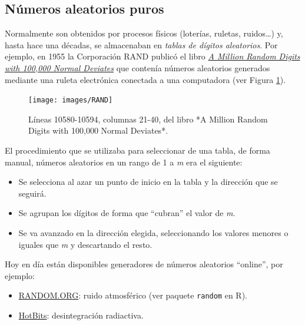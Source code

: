 \documentclass[
]{book}
\theoremstyle{break}
\theoremstyle{nonumberplain}
\begin{document}
\hypertarget{nuxfameros-aleatorios-puros}{%
\subsection{Números aleatorios puros}\label{nuxfameros-aleatorios-puros}}

Normalmente son obtenidos por procesos físicos (loterías, ruletas, ruidos\ldots) y, hasta hace una décadas, se almacenaban en \emph{tablas de dígitos aleatorios}.
Por ejemplo, en 1955 la Corporación RAND publicó el libro \href{https://www.rand.org/pubs/monograph_reports/MR1418.html}{\emph{A Million Random Digits with 100,000 Normal Deviates}} que contenía números aleatorios generados mediante una ruleta electrónica conectada a una computadora (ver Figura \ref{fig:randbook}).

\begin{figure}[!htb]

{\centering \texttt{[image: images/RAND]} 

}

\caption{Líneas 10580-10594, columnas 21-40, del libro *A Million Random Digits with 100,000 Normal Deviates*.}\label{fig:randbook}
\end{figure}

El procedimiento que se utilizaba para seleccionar de una tabla, de forma manual, números aleatorios
en un rango de 1 a \emph{m} era el siguiente:

\begin{itemize}
\item
  Se selecciona al azar un punto de inicio en la tabla
  y la dirección que se seguirá.
\item
  Se agrupan los dígitos de forma que ``cubran'' el valor de \emph{m}.
\item
  Se va avanzado en la dirección elegida, seleccionando los valores menores o iguales que \emph{m} y descartando el resto.
\end{itemize}

Hoy en día están disponibles generadores de números aleatorios ``online'', por ejemplo:

\begin{itemize}
\item
  \href{http://www.random.org/integers}{RANDOM.ORG}: ruido atmosférico
  (ver paquete \texttt{random} en R).
\item
  \href{http://www.fourmilab.ch/hotbits}{HotBits}: desintegración radiactiva.
\end{itemize}
\end{document}
